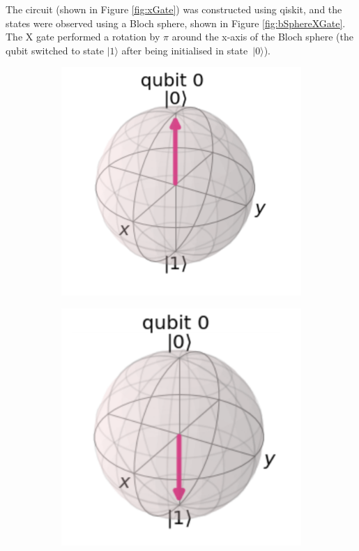 The circuit (shown in Figure \ref{fig:xGate}) was constructed using qiskit, and the states were observed using a Bloch sphere, shown in Figure \ref{fig:bSphereXGate}. The X gate performed a rotation by $\pi$ around the x-axis of the Bloch sphere (the qubit switched to state $|1\rangle$ after being initialised in state~$|0\rangle$).

\begin{figure}[h]
    \centering
    \begin{subfigure}[h]{0.33\textwidth}
        \centering
        \includegraphics[width=\textwidth]{lab2/images/bSphX1.png}
        \caption{}
        \label{fig:bSphX1}
    \end{subfigure}
    \hspace{0.2\textwidth}
    \begin{subfigure}[h]{0.33\textwidth}
        \centering
        \includegraphics[width=\textwidth]{lab2/images/bSphX2.png}

\end{subfigure}
\end{figure}
